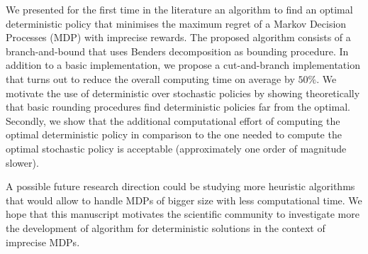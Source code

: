 We presented for the first time in the literature an algorithm to find an optimal deterministic policy that minimises the maximum regret of a Markov Decision Processes (MDP) with imprecise rewards.
The proposed algorithm consists of a branch-and-bound that uses Benders decomposition as bounding procedure. In addition to a basic implementation, we propose a cut-and-branch implementation that turns out to reduce the overall computing time on average by $50\%$.  
We motivate the use of deterministic over stochastic policies by showing theoretically that basic rounding procedures find deterministic policies far from the optimal. Secondly, we show that the additional computational effort of computing the optimal deterministic policy in comparison to the one needed to compute the optimal stochastic policy is acceptable (approximately one order of magnitude slower). 

A possible future research direction could be studying more heuristic algorithms that would allow to handle MDPs of bigger size with less computational time. We hope that this manuscript motivates the scientific community to investigate more the development of algorithm for deterministic solutions in the context of imprecise MDPs.

